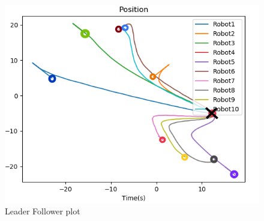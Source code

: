 \documentclass[10pt]{beamer}
\begin{document}
\begin{frame}
	\begin{minipage}{0.47\textwidth}
		\begin{figure}[h!]
			\centering
			\includegraphics[scale=0.27]{Position-leader.png}
			\caption{Leader Follower plot}
			\label{Fig:pos_y_c}
		\end{figure}
	\end{minipage}


\end{frame}
\end{document}
